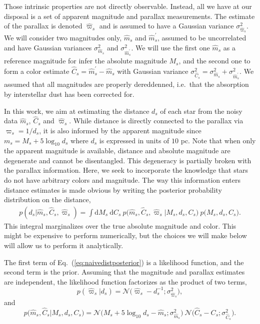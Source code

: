 \documentclass[manuscript, letterpaper]{aastex6}
\newcommand{\ie}{{{i.e.}~}}
\newcommand{\equref}[1]{{\xspace}Eq.~(\ref{#1})}
\renewcommand{\d}{{\mathrm{d}}}
\newcommand{\equ}[1]{\begin{equation}#1\end{equation}}
\newcommand{\eqn}[1]{\begin{eqnarray}#1\end{eqnarray}}
\begin{document}
Those intrinsic properties are not directly observable.
Instead, all we have at our disposal is a set of apparent magnitude and parallax measurements.  
The estimate of the parallax is denoted $\hat{\varpi}_s$ and is assumed to have a Gaussian variance $\sigma_{\hat{\varpi}_s}^2$.
We will consider two magnitudes only, $\hat{m}_s$ and $\hat{m}^\prime_s$, assumed to be uncorrelated and have Gaussian variances $\sigma_{\hat{m}_s}^2$ and $\sigma_{\hat{m}^\prime_s}^2$.
We will use the first one $\hat{m}_s$ as a reference magnitude for infer the absolute magnitude $M_s$, and the second one to form a color estimate $\hat{C}_s =\hat{m}^\prime_s - \hat{m}_s $ with Gaussian variance $\sigma_{\hat{C}_s}^2 = \sigma_{\hat{m}_s}^2 + \sigma_{\hat{m}^\prime_s}^2$.
We assumed that all magnitudes are properly dereddenned, \ie that the absorption by interstellar dust has been corrected for.

In this work, we aim at estimating the distance $d_s$ of each star from the noisy data $\hat{m}_s$,  $\hat{C}_s$ and $\hat{\varpi}_s$. 
While distance is directly connected to the parallax via $\varpi_s=1/d_s$, it is also informed by the apparent magnitude since $m_s = M_s + 5\log_{10} d_s$ where $d_s$ is expressed in units of $10$ pc.
Note that when only the apparent magnitude is available, distance and absolute magnitude are degenerate and cannot be disentangled. 
This degeneracy is partially broken with the parallax information.
Here, we seek to incorporate the knowledge that stars do not have arbitrary colors and magnitude.
The way this information enters distance estimates is made obvious by writing the posterior probability distribution on the distance,
\eqn{
	p(d_s | \hat{m}_s, \hat{C}_s, \hat{\varpi}_s) = \int \d M_s \ \d C_s \ p\bigl(\hat{m}_s, \hat{C}_s, \hat{\varpi}_s \bigr\rvert M_s, d_s, C_s\bigr) \ p\bigl( M_s, d_s, C_s \bigr) \label{eq:naivedistposterior}.
}
This integral marginalizes over the true absolute magnitude and color.
This might be expensive to perform numerically, but the choices we will make below will allow us to perform it analytically.

The first term of \equref{eq:naivedistposterior} is a likelihood function, and the second term is the prior. 
Assuming that the magnitude and parallax estimates are independent, the likelihood function factorizes as the product of two terms, 
\equ{
	p\left(\hat{\varpi}_s \bigr\rvert d_s\right) = \mathcal{N}\bigl(\hat{\varpi}_s - d_s^{-1};\sigma_{\hat{\varpi}_s}^2 \bigr),\label{eq:parallaxlike}
}
and
\equ{
	p\bigl(\hat{m}_s, \hat{C}_s \bigr\rvert M_s, d_s, C_s\bigr)  =  \mathcal{N}\bigl( M_s + 5\log_{10}d_s  -\hat{m}_s ;\sigma_{\hat{m}_s}^2 \bigr) \  \mathcal{N}\bigl(\hat{C}_s - C_s;\sigma_{\hat{C}_s}^2 \bigr).
}
\end{document}
